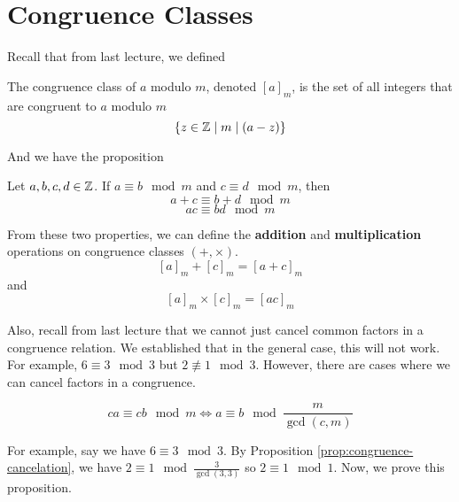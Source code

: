 

\newcommand\lcm{\mathrm{lcm}}



\section{Congruence Classes}

Recall that from last lecture, we defined

\begin{definition}
    The congruence class of $a$ modulo $m$, denoted $[a]_m$, is the set of all integers that are congruent to $a$ modulo $m$
    $$
    \{ z \in \mathbb{Z} \mid m \mathrel{\mid} (a-z) \}
    $$
\end{definition}

And we have the proposition

\begin{proposition}
    Let $a,b,c,d \in \mathbb{Z}$. If $a \equiv b \mod m$ and $c \equiv d \mod m$, then
    \begin{equation} \label{eq:congruence-prop-1}
        a + c \equiv b + d \mod m
    \end{equation}
    \begin{equation} \label{eq:congruence-prop-2}
        ac \equiv bd \mod m
    \end{equation}
\end{proposition}

From these two properties, we can define the \textbf{addition} and \textbf{multiplication} operations on congruence classes $(+,\times)$.
$$
[a]_m + [c]_m = [a+c]_m
$$
and
$$
[a]_m \times [c]_m = [ac]_m
$$

Also, recall from last lecture that we cannot just cancel common factors in a congruence relation. We established that in the general case, this will not work. For example, $6 \equiv 3 \mod 3$ but $2 \not\equiv 1 \mod 3$. However, there are cases where we can cancel factors in a congruence.

\begin{proposition} \label{prop:congruence-cancelation}
    $$
    ca \equiv cb \mod m \iff a \equiv b \mod \frac{m}{\gcd(c,m)}
    $$
\end{proposition}

For example, say we have $6 \equiv 3 \mod 3$. By Proposition \ref{prop:congruence-cancelation}, we have $2 \equiv 1 \mod \frac{3}{\gcd(3,3)}$ so $2 \equiv 1 \mod 1$. Now, we prove this proposition.

